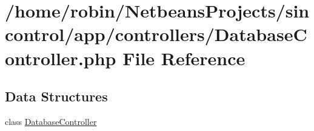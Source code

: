 \hypertarget{_database_controller_8php}{}\section{/home/robin/\+Netbeans\+Projects/sincontrol/app/controllers/\+Database\+Controller.php File Reference}
\label{_database_controller_8php}
\subsection*{Data Structures}
\begin{DoxyCompactItemize}
\item 
class \hyperlink{class_database_controller}{Database\+Controller}
\end{DoxyCompactItemize}
